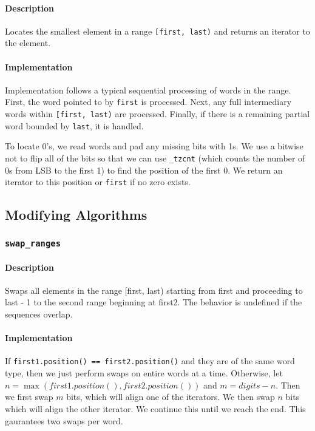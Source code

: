 \documentclass[letterpaper, 8pt]{article}
\begin{document}
\paragraph{Description}
Locates the smallest element in a range \texttt{[first, last)} and returns an 
iterator to the element.

\paragraph{Implementation}
Implementation follows a typical sequential processing of words in the range. 
First, the word pointed to by \texttt{first} is processed. Next, any full 
intermediary words within \texttt{[first, last)} are processed. Finally, if 
there is a remaining partial word bounded by \texttt{last}, it is handled.

To locate 0's, we read words and pad any missing bits with 1s. We use a 
bitwise not to flip all of the bits so that we can use \texttt{\_tzcnt} 
(which counts the number of 0s from LSB to the first 1) to find the position of 
the first 0. We return an iterator to this position or \texttt{first} if no zero 
exists.


\subsection{Modifying Algorithms}
\label{subsec:modifyingAlgs}

\subsubsection{\texttt{swap\_ranges}}
\label{subsubsec:swap_ranges}
\paragraph{Description}
Swaps all elements in the range [first, last) starting from first and 
proceeding to last - 1 to the second range beginning at first2. 
The behavior is undefined if the sequences overlap.

\paragraph{Implementation}
    If \texttt{first1.position() == first2.position()} and they are of the same
    word type, then we just perform swaps on entire words at a time. Otherwise,
    let $n=\max(first1.position(), first2.position())$ and
    $m = digits - n$. Then we first swap $m$ bits, which will align one of the
    iterators. We then swap $n$ bits which will align the other iterator. We 
    continue this until we reach the end. This gaurantees two swaps per word.
\end{document}
